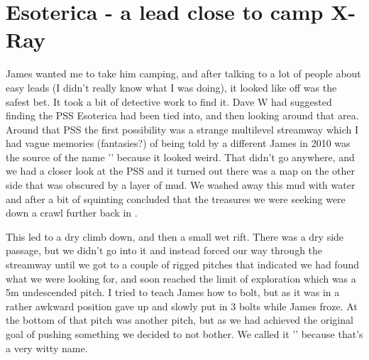 \section{Esoterica - a lead close to camp X-Ray}
\begin{marginfigure}
\end{marginfigure}

James wanted me to take him camping, and after talking to a lot of people about easy leads (I didn't really know what I was doing), it looked like  off  was the safest bet. It took a bit of detective work to find it. Dave W had suggested finding the PSS Esoterica had been tied into, and then looking around that area. Around that PSS the first possibility was a strange multilevel streamway which I had vague memories (fantasies?) of being told by a different James in 2010 was the source of the name '' because it looked weird. That didn't go anywhere, and we had a closer look at the PSS and it turned out there was a map on the other side that was obscured by a layer of mud. We washed away this mud with water and after a bit of squinting concluded that the treasures we were seeking were down a crawl further back in . 

This led to a dry climb down, and then a small wet rift. There was a dry side passage, but we didn't go into it and instead forced our way through the streamway until we got to a couple of rigged pitches that indicated we had found what we were looking for, and soon reached the limit of exploration which was a 5m undescended pitch. I tried to teach James how to bolt, but as it was in a rather awkward position gave up and slowly put in 3 bolts while James froze. At the bottom of that pitch was another pitch, but as we had achieved the original goal of pushing something we decided to not bother. We called it '' because that's a very witty name. 

